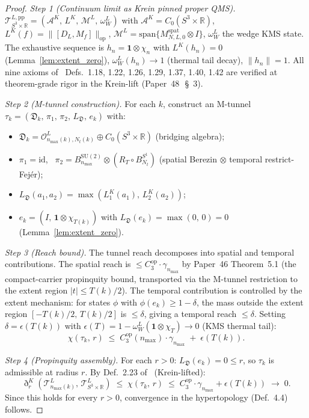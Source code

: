 \documentclass[11pt,a4paper]{article}
\theoremstyle{plain}
\theoremstyle{definition}
\newcommand{\nmax}{n_{\max}}
\newcommand{\Nt}{N_{t}}
\newcommand{\sthree}{S^{3}}
\newcommand{\Sone}{S^{1}}
\newcommand{\Op}{\mathcal{O}}
\newcommand{\Acal}{\mathcal{A}}
\newcommand{\Tcal}{\mathcal{T}}
\newcommand{\opnorm}[1]{\lVert #1 \rVert_{\mathrm{op}}}
\newcommand{\norm}[1]{\lVert #1 \rVert}
\newcommand{\R}{\mathbb{R}}
\newcommand{\SU}{\mathrm{SU}}
\newcommand{\DL}{D_{L}}
\newcommand{\Cthreeop}{C_{3}^{\mathrm{op}}}
\newcommand{\spat}{\mathrm{spat}}
\begin{document}
\begin{proof}
\emph{Step 1 (Continuum limit as Krein pinned proper QMS).}
$\Tcal^{L,\mathrm{pp}}_{S^{3} \times \R}
= (\Acal^{K},\, L^{K},\, \mathcal{M}^{L},\, \omega_{W}^{L})$
with $\Acal^{K} = C_{0}(\sthree \times \R)$,
$L^{K}(f) = \opnorm{[\DL, M_{f}]}$,
$\mathcal{M}^{L} = \mathrm{span}\{M^{\spat}_{N,L,0} \otimes I\}$,
$\omega_{W}^{L}$ the wedge KMS state.
The exhaustive sequence is $h_{n} = \mathbf{1} \otimes \chi_{n}$
with $L^{K}(h_{n}) = 0$
(Lemma~\ref{lem:extent_zero}),
$\omega_{W}^{L}(h_{n}) \to 1$
(thermal tail decay),
$\norm{h_{n}} = 1$.
All nine axioms of~\cite{latremoliere2025_hypertopology}
Defs.~1.18, 1.22, 1.26, 1.29, 1.37, 1.40, 1.42 are verified at
theorem-grade rigor in the Krein-lift
(Paper~48~\cite{paper48}\,\S~3).

\emph{Step 2 (M-tunnel construction).}
For each $k$, construct an M-tunnel
$\tau_{k} = (\mathfrak{D}_{k},\, \pi_{1},\, \pi_{2},\,
L_{\mathfrak{D}},\, e_{k})$ with:
\begin{itemize}
\item $\mathfrak{D}_{k}
      = \Op^{L}_{\nmax(k), \Nt(k)} \oplus C_{0}(\sthree \times \R)$
      (bridging algebra);
\item $\pi_{1} = \mathrm{id}$, \
      $\pi_{2} = B^{\SU(2)}_{\nmax} \otimes (R_{T} \circ B^{\Sone}_{\Nt})$
      (spatial Berezin $\otimes$ temporal restrict-Fej\'er);
\item $L_{\mathfrak{D}}(a_{1}, a_{2})
      = \max(L^{K}_{1}(a_{1}),\, L^{K}_{2}(a_{2}))$;
\item $e_{k} = (I,\, \mathbf{1} \otimes \chi_{T(k)})$
      with $L_{\mathfrak{D}}(e_{k}) = \max(0,\, 0) = 0$
      (Lemma~\ref{lem:extent_zero}).
\end{itemize}

\emph{Step 3 (Reach bound).}
The tunnel reach decomposes into spatial and temporal contributions.
The spatial reach is $\le \Cthreeop \cdot \gamma_{\nmax}$ by
Paper~46 Theorem~5.1 (the compact-carrier propinquity
bound, transported via the M-tunnel restriction to the extent
region $|t| \le T(k)/2$). The temporal contribution is controlled
by the extent mechanism: for states $\phi$ with
$\phi(e_{k}) \ge 1 - \delta$, the mass outside the extent
region $[-T(k)/2,\, T(k)/2]$ is $\le \delta$, giving a
temporal reach $\le \delta$. Setting $\delta = \epsilon(T(k))$
with $\epsilon(T) = 1 - \omega_{W}^{L}(\mathbf{1} \otimes \chi_{T})
\to 0$ (KMS thermal tail):
\[
   \chi(\tau_{k},\, r) \;\le\; \Cthreeop(\nmax) \cdot \gamma_{\nmax}
   \;+\; \epsilon(T(k)).
\]

\emph{Step 4 (Propinquity assembly).}
For each $r > 0$: $L_{\mathfrak{D}}(e_{k}) = 0 \le r$, so
$\tau_{k}$ is admissible at radius $r$. By
Def.~2.23 of~\cite{latremoliere2025_hypertopology} (Krein-lifted):
\[
   \eth_{r}^{K}(\Tcal^{L}_{\nmax(k)},\,
   \Tcal^{L}_{S^{3} \times \R})
   \;\le\; \chi(\tau_{k},\, r)
   \;\le\; \Cthreeop \cdot \gamma_{\nmax} + \epsilon(T(k))
   \;\to\; 0.
\]
Since this holds for every $r > 0$, convergence in the hypertopology
(Def.~4.4) follows.
\end{proof}
\end{document}
